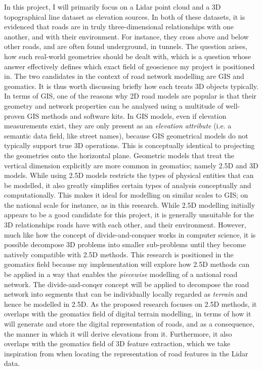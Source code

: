 In this project, I will primarily focus on a Lidar point cloud and a 3D topographical line dataset as elevation sources. In both of these datasets, it is evidenced that roads are in truly three-dimensional relationships with one another, and with their environment. For instance, they cross above and below other roads, and are often found underground, in tunnels. The question arises, how such real-world geometries should be dealt with, which is a question whose answer effectively defines which exact field of geoscience my project is positioned in. The two candidates in the context of road network modelling are GIS and geomatics. It is thus worth discussing briefly how each treats 3D objects typically. In terms of GIS, one of the reasons why 2D road models are popular is that their geometry and network properties can be analysed using a multitude of well-proven GIS methods and software kits. In GIS models, even if elevation measurements exist, they are only present as an \textit{elevation attribute} (i.e. a semantic data field, like street names), because GIS geometrical models do not typically support true 3D operations. This is conceptually identical to projecting the geometries onto the horizontal plane. Geometric models that treat the vertical dimension explicitly are more common in geomatics; namely 2.5D and 3D models. While using 2.5D models restricts the types of physical entities that can be modelled, it also greatly simplifies certain types of analysis conceptually and computationally. This makes it ideal for modelling on similar scales to GIS; on the national scale for instance, as in this research. While 2.5D modelling initially appears to be a good candidate for this project, it is generally unsuitable for the 3D relationships roads have with each other, and their environment. However, much like how the concept of divide-and-conquer works in computer science, it is possible decompose 3D problems into smaller sub-problems until they become natively compatible with 2.5D methods. This research is positioned in the geomatics field because my implementation will explore how 2.5D methods can be applied in a way that enables the \textit{piecewise} modelling of a national road network. The divide-and-conqer concept will be applied to decompose the road network into segments that can be individually locally regarded as \textit{terrain} and hence be modelled in 2.5D. As the proposed research focuses on 2.5D methods, it overlaps with the geomatics field of digital terrain modelling, in terms of how it will generate and store the digital representation of roads, and as a consequence, the manner in which it will derive elevations from it. Furthermore, it also overlaps with the geomatics field of 3D feature extraction, which we take inspiration from when locating the representation of road features in the Lidar data.





